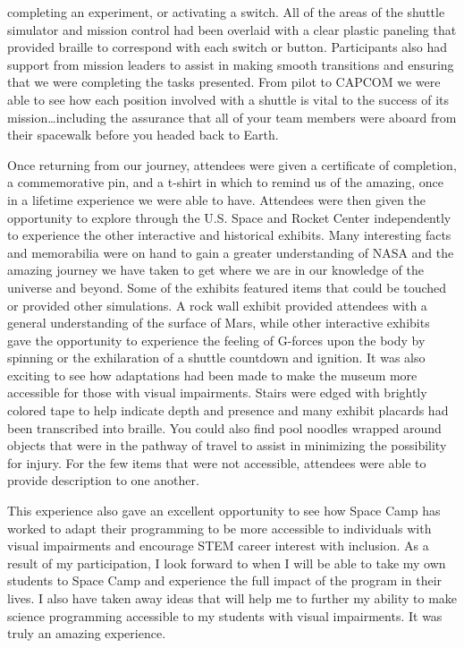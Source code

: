 \documentclass[11.5pt]{sig-alternate} %
\begin{document}
\begin{large}
\clearpage

completing an experiment, or activating a switch. All of the areas of the shuttle simulator and mission control had been overlaid with a clear plastic paneling that provided braille to correspond with each switch or button. Participants also had support from mission leaders to assist in making smooth transitions and ensuring that we were completing the tasks presented. From pilot to CAPCOM we were able to see how each position involved with a shuttle is vital to the success of its mission…including the assurance that all of your team members were aboard from their spacewalk before you headed back to Earth. 

Once returning from our journey, attendees were given a certificate of completion, a commemorative pin, and a t-shirt in which to remind us of the amazing, once in a lifetime experience we were able to have. Attendees were then given the opportunity to explore through the U.S. Space and Rocket Center independently to experience the other interactive and historical exhibits. Many interesting facts and memorabilia were on hand to gain a greater understanding of NASA and the amazing journey we have taken to get where we are in our knowledge of the universe and beyond. Some of the exhibits featured items that could be touched or provided other simulations. A rock wall exhibit provided attendees with a general understanding of the surface of Mars, while other interactive exhibits gave the opportunity to experience the feeling of G-forces upon the body by spinning or the exhilaration of a shuttle countdown and ignition. It was also exciting to see how adaptations had been made to make the museum more accessible for those with visual impairments. Stairs were edged with brightly colored tape to help indicate depth and presence and many exhibit placards had been transcribed into braille. You could also find pool noodles wrapped around objects that were in the pathway of travel to assist in minimizing the possibility for injury. For the few items that were not accessible, attendees were able to provide description to one another.

This experience also gave an excellent opportunity to see how Space Camp has worked to adapt their programming to be more accessible to individuals with visual impairments and encourage STEM career interest with inclusion.  As a result of my participation, I look forward to when I will be able to take my own students to Space Camp and experience the full impact of the program in their lives.  I also have taken away ideas that will help me to further my ability to make science programming accessible to my students with visual impairments.  It was truly an amazing experience.

\end{large}
\end{document}
